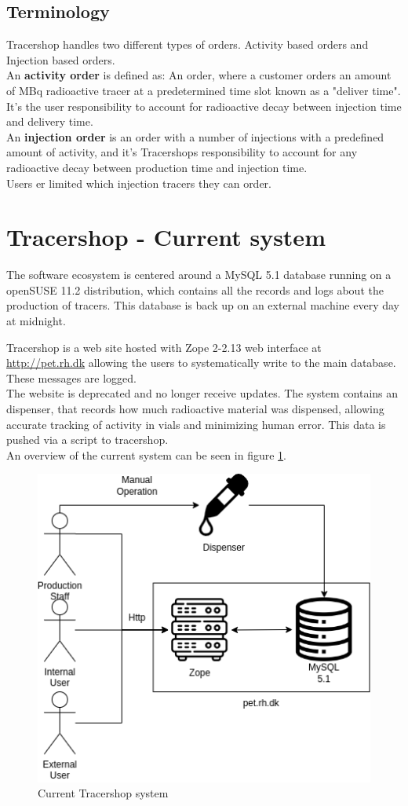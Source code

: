 \documentclass{article}
\begin{document}
\subsection*{Terminology}

Tracershop handles two different types of orders. Activity based orders and Injection based orders.\\
An \textbf{activity order} is defined as: An order, where a customer orders an amount of MBq radioactive tracer at a predetermined time slot known as a "deliver time".
It's the user responsibility to account for radioactive decay between injection time and delivery time.\\
An \textbf{injection order} is an order with a number of injections with a predefined amount of activity, and it's Tracershops responsibility to account for any radioactive decay between production time and injection time.\\
Users er limited which injection tracers they can order.


\section*{Tracershop - Current system}

The software ecosystem is centered around a MySQL 5.1 database running on a openSUSE 11.2 distribution, which contains all the records and logs about the production of tracers. This database is back up on an external machine every day at midnight.

Tracershop is a web site hosted with Zope 2-2.13 web interface at \url{http://pet.rh.dk} allowing the users to systematically write to the main database. These messages are logged.\\
The website is deprecated and no longer receive updates.
The system contains an dispenser, that records how much radioactive material was dispensed, allowing accurate tracking of activity in vials and minimizing human error. This data is pushed via a script to tracershop.\\
An overview of the current system can be seen in figure \ref{fig:oldsys}.
\begin{figure}[ht]
  \begin{center}
    \includegraphics[width=0.6\linewidth]{OldSetup.png}
    \caption{Current Tracershop system}
    \label{fig:oldsys}
  \end{center}
\end{figure}
\end{document}
